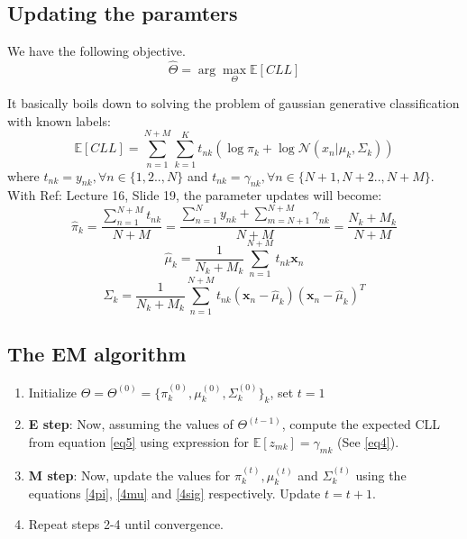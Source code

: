 \documentclass[a4paper,11pt]{article}
\begin{document}
\begin{mlsolution}
\subsection{Updating the paramters}
We have the following objective.
\[
\hat{\Theta} = \arg \max_{\Theta} \mathbb{E}[CLL]
\]

It basically boils down to solving the problem of gaussian generative classification with known labels:
\[
\mathbb{E}[CLL] = \sum_{n=1}^{N+M}\sum_{k=1}^{K}t_{nk}\left( \log \pi_k + \log \mathcal{N}(x_n| \mu_k, \Sigma_k) \right)
\]
where $t_{nk} = y_{nk}, \forall n\in\{1,2..,N\}$ and $t_{nk} = \gamma_{nk}, \forall n\in\{N+1,N+2..,N+M\}$. With Ref: Lecture 16, Slide 19, the parameter updates will become:
\begin{equation}
\label{4pi}
\hat{\pi}_{k} = \frac{\sum_{n=1}^{N+M}t_{nk}}{N+M} = \frac{\sum_{n=1}^{N}y_{nk}+\sum_{m=N+1}^{N+M}\gamma_{nk}}{N+M} = \frac{N_{k}+M_{k}}{N+M}
\end{equation}
\begin{equation}
\label{4mu}
\hat{\mu}_{k} = \frac{1}{N_{k}+M_{k}}\sum_{n=1}^{N+M}t_{nk}\textbf{x}_{n}
\end{equation}
\begin{equation}
\label{4sig}
\hat{\Sigma}_{k} = \frac{1}{N_{k}+M_{k}}\sum_{n=1}^{N+M}t_{nk}(\textbf{x}_{n} - \hat{\mu}_{k})(\textbf{x}_{n} - \hat{\mu}_{k})^{T}
\end{equation}
\subsection{The EM algorithm}
\begin{enumerate}
	\item Initialize $\Theta = \Theta^{(0)} = \{\pi^{(0)}_{k}, \mu^{(0)}_k, \Sigma^{(0)}_k\}_{k}$, set $t = 1$
	\item \textbf{E step}: Now, assuming the values of $\Theta^{(t-1)}$, compute the expected CLL from equation \ref{eq5} using expression for $\mathbb{E}[z_{mk}] = \gamma_{mk}$ (See \ref{eq4}).
	\item \textbf{M step}: Now, update the values for $\pi^{(t)}_{k}, \mu^{(t)}_k$ and $\Sigma^{(t)}_k$ using the equations \ref{4pi}, \ref{4mu} and \ref{4sig} respectively. Update $t = t+1$.
	\item Repeat steps 2-4 until convergence.
\end{enumerate}
\end{mlsolution}
	
\end{document}
